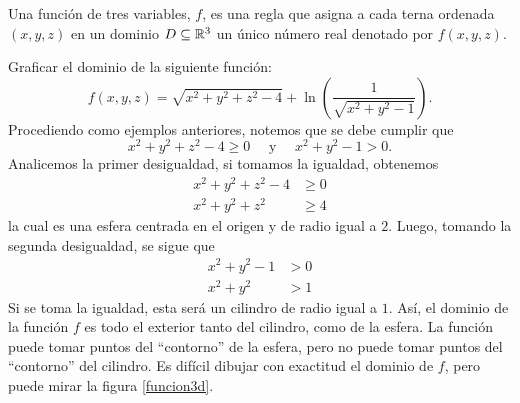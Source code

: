 \begin{definition}
    Una función de tres variables, $f$, es una regla que asigna a cada terna ordenada $(x, y, z)$ en un dominio $D \subseteq \RR[3]$ un único número real denotado por $f(x, y, z)$.
\end{definition}

\begin{example}
    Graficar el dominio de la siguiente función:
    $$f(x, y, z) = \sqrt{x^2 + y^2 + z^2 - 4} + \ln \left( \frac{1}{\sqrt{x^2 + y^2 -1}} \right).$$
    \solucion Procediendo como ejemplos anteriores, notemos que se debe cumplir que
    $$x^2 + y^2 + z^2 - 4 \geq 0 \quad \text{ y } \quad x^2 + y^2 - 1 > 0.$$
    Analicemos la primer desigualdad, si tomamos la igualdad, obtenemos
    \begin{align*}
        x^2 + y^2 + z^2 - 4 & \geq 0 \\
        x^2 + y^2 + z^2 & \geq 4
    \end{align*}
    la cual es una esfera centrada en el origen y de radio igual a $2$. Luego, tomando la segunda desigualdad, se sigue que
    \begin{align*}
        x^2 + y^2 - 1 & > 0 \\
        x^2 + y^2 & > 1
    \end{align*}
    Si se toma la igualdad, esta será un cilindro de radio igual a $1$. Así, el dominio de la función $f$ es todo el exterior tanto del cilindro, como de la esfera. La función puede tomar puntos del “contorno” de la esfera, pero no puede tomar puntos del “contorno” del cilindro. Es difícil dibujar con exactitud el dominio de $f$, pero puede mirar la figura \ref{funcion3d}.\sideFigure[\label{funcion3d}]{
}
\end{example}
